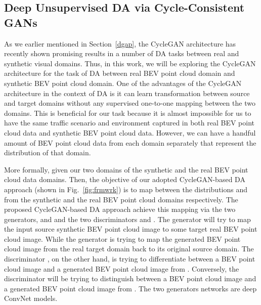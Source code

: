 \documentclass[letterpaper, 10 pt, conference]{IEEEtran}
\begin{document}
\subsection{Deep Unsupervised DA via Cycle-Consistent GANs} \label{cycGAN}
As we earlier mentioned in Section~\ref{dgap}, the CycleGAN architecture has recently shown promising results in a number of DA tasks between real and synthetic visual domains. Thus, in this work, we will be exploring the CycleGAN architecture for the task of DA between real BEV point cloud domain and synthetic BEV point cloud domain. One of the advantages of the CycleGAN architecture in the context of DA is it can learn transformation between source and target domains without any supervised one-to-one mapping between the two domains. This is beneficial for our task because it is almost impossible for us to have the same traffic scenario and environment captured in both real BEV point cloud data and synthetic BEV point cloud data. However, we can have a handful amount of BEV point cloud data from each domain separately that represent the distribution of that domain.  

\smallbreak
More formally, given our two domains  of the synthetic and the real BEV point cloud data domains. Then, the objective of our adopted CycleGAN-based DA approach (shown in Fig.~\ref{fig:frmwrk}) is to map between the distributions  and  from the synthetic and the real BEV point cloud domains respectively. The proposed CycleGAN-based DA approach achieve this mapping via the two generators,  and  and the two discriminators  and . The generator  will try to map the input source synthetic BEV point cloud image to some target real BEV point cloud image. While the generator  is trying to map the generated BEV point cloud image from the real target domain back to its original source domain. The discriminator , on the other hand, is trying to differentiate between a BEV point cloud image  and a generated BEV point cloud image from . Conversely, the discriminator  will be trying to distinguish between a BEV point cloud image  and a generated BEV point cloud image from . The two generators networks are deep ConvNet models. 
\end{document}
